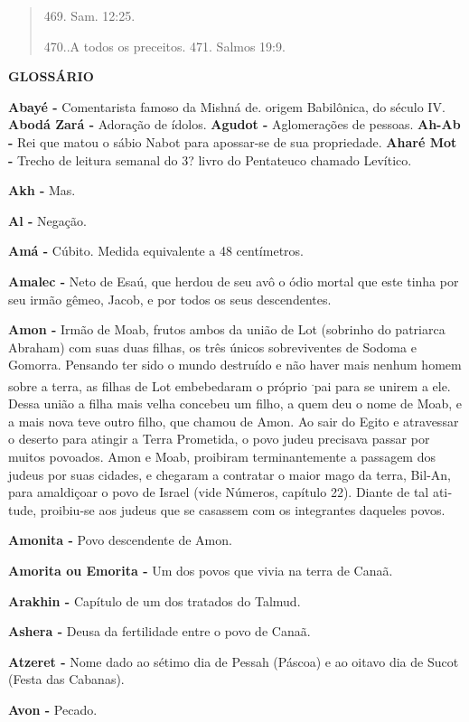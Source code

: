 \begin{quote}
469. Sam. 12:25.

470..A todos os preceitos. 471. Salmos 19:9.
\end{quote}

\textbf{GLOSSÁRIO}

\textbf{Abayé -} Comentarista famoso da Mish­ná de. origem Babilônica,
do século IV. \textbf{Abodá Zará -} Adoração de ídolos. \textbf{Agudot
-} Aglomerações de pessoas. \textbf{Ah-Ab -} Rei que matou o sábio Nabot
para apossar-se de sua propriedade. \textbf{Aharé Mot -} Trecho de
leitura sema­nal do 3? livro do Pentateuco chama­do Levítico.

\textbf{Akh -} Mas.

\textbf{Al -} Negação.

\textbf{Amá -} Cúbito. Medida equivalente a 48 centímetros.

\textbf{Amalec -} Neto de Esaú, que herdou de seu avô o ódio mortal que
este tinha por seu irmão gêmeo, Jacob, e por to­dos os seus
descendentes.

\textbf{Amon -} Irmão de Moab, frutos ambos da união de Lot (sobrinho do
patriar­ca Abraham) com suas duas filhas, os três únicos sobreviventes
de Sodoma e Gomorra. Pensando ter sido o mun­do destruído e não haver
mais nenhum homem sobre a terra, as filhas de Lot embebedaram o próprio
\textsuperscript{.}pai para se unirem a ele. Dessa união a filha mais
velha concebeu um filho, a quem deu o nome de Moab, e a mais nova teve
outro filho, que chamou de Amon. Ao sair do Egito e atravessar o deserto
pa­ra atingir a Terra Prometida, o povo ju­deu precisava passar por
muitos po­voados. Amon e Moab, proibiram ter­minantemente a passagem dos
judeus por suas cidades, e chegaram a contra­tar o maior mago da terra,
Bil-An, para amaldiçoar o povo de Israel (vide Nú­meros, capítulo 22).
Diante de tal ati­tude, proibiu-se aos judeus que se ca­sassem com os
integrantes daqueles povos.

\textbf{Amonita -} Povo descendente de Amon.

\textbf{Amorita ou Emorita -} Um dos povos que vivia na terra de Canaã.

\textbf{Arakhin -} Capítulo de um dos tratados do Talmud.

\textbf{Ashera -} Deusa da fertilidade entre o povo de Canaã.

\textbf{Atzeret -} Nome dado ao sétimo dia de Pessah (Páscoa) e ao
oitavo dia de Su­cot (Festa das Cabanas).

\textbf{Avon -} Pecado.

